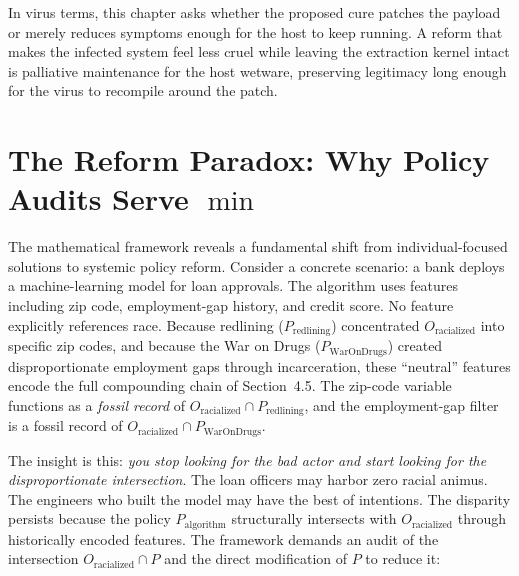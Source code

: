 In virus terms, this chapter asks whether the proposed cure patches the payload or merely reduces symptoms enough for the host to keep running. A reform that makes the infected system feel less cruel while leaving the extraction kernel intact is palliative maintenance for the host wetware, preserving legitimacy long enough for the virus to recompile around the patch.

\section{The Reform Paradox: Why Policy Audits Serve \texorpdfstring{$\min$}{min}}

The mathematical framework reveals a fundamental shift from individual-focused solutions to systemic policy reform. Consider a concrete scenario: a bank deploys a machine-learning model for loan approvals. The algorithm uses features including zip code, employment-gap history, and credit score. No feature explicitly references race. Because redlining ($P_{\text{redlining}}$) concentrated $O_{\text{racialized}}$ into specific zip codes, and because the War on Drugs ($P_{\text{WarOnDrugs}}$) created disproportionate employment gaps through incarceration, these ``neutral'' features encode the full compounding chain of Section~4.5. The zip-code variable functions as a \textit{fossil record} of $O_{\text{racialized}} \cap P_{\text{redlining}}$, and the employment-gap filter is a fossil record of $O_{\text{racialized}} \cap P_{\text{WarOnDrugs}}$.

The insight is this: \textit{you stop looking for the bad actor and start looking for the disproportionate intersection}. The loan officers may harbor zero racial animus. The engineers who built the model may have the best of intentions. The disparity persists because the policy $P_{\text{algorithm}}$ structurally intersects with $O_{\text{racialized}}$ through historically encoded features. The framework demands an audit of the intersection $O_{\text{racialized}} \cap P$ and the direct modification of $P$ to reduce it:

